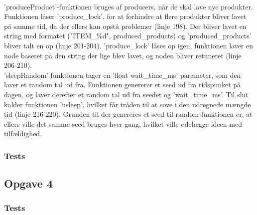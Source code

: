 \\ 'produceProduct'-funktionen bruges af producers, når de skal lave nye produkter. Funktionen låser 'produce_lock', for at forhindre at flere produkter bliver lavet på samme tid, da der ellers kan opstå problemer (linje 198). Der bliver lavet en string med formatet ("ITEM_\%d", produced_products) og 'produced_products' bliver talt en op (linje 201-204). 'produce_lock' låses op igen, funktionen laver en node baseret på den string der lige blev lavet, og noden bliver retuneret (linje 206-210).
\\ 'sleepRandom'-funktionen tager en 'float wait_time_ms' parameter, som den laver et random tal ud fra. Funktionen genererer et seed ud fra tidspunket på dagen, og laver derefter et random tal ud fra seedet og 'wait_time_ms'. Til slut kalder funktionen 'usleep', hvilket får tråden til at sove i den udregnede mængde tid (linje 216-220). Grunden til der genereres et seed til random-funktionen er, at ellers ville det samme seed bruges hver gang, hvilket ville ødelægge ideen med tilfældighed.

\subsubsection{Tests}
\label{O3_Tests}

\subsection{Opgave 4}
\label{O4}


\subsubsection{Tests}
\label{O4_Tests}
